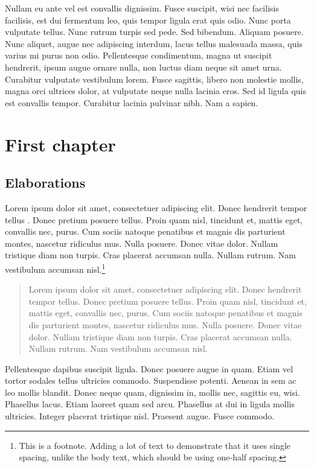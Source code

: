 \documentclass{hacett-socsci-thesis}
\begin{document}
Nullam eu ante vel est convallis dignissim.  Fusce suscipit, wisi nec
facilisis facilisis, est dui fermentum leo, quis tempor ligula erat
quis odio.  Nunc porta vulputate tellus.  Nunc rutrum turpis sed pede.
Sed bibendum.  Aliquam posuere.  Nunc aliquet, augue nec adipiscing
interdum, lacus tellus malesuada massa, quis varius mi purus non odio.
Pellentesque condimentum, magna ut suscipit hendrerit, ipsum augue
ornare nulla, non luctus diam neque sit amet urna.  Curabitur
vulputate vestibulum lorem.  Fusce sagittis, libero non molestie
mollis, magna orci ultrices dolor, at vulputate neque nulla lacinia
eros.  Sed id ligula quis est convallis tempor.  Curabitur lacinia
pulvinar nibh.  Nam a sapien.

\chapter{First chapter}
\section{Elaborations}

Lorem ipsum dolor sit amet, consectetuer adipiscing elit.  Donec
hendrerit tempor tellus \autocite{cheng1996}.  Donec pretium
posuere tellus.  Proin quam nisl, tincidunt et, mattis eget, convallis
nec, purus.  Cum sociis natoque penatibus et magnis dis parturient
montes, nascetur ridiculus mus.  Nulla posuere.  Donec vitae dolor.
Nullam tristique diam non turpis.  Cras placerat accumsan nulla.
Nullam rutrum.  Nam vestibulum accumsan nisl.\footnote{This is a
  footnote. Adding a lot of text to demonstrate that it uses single
  spacing, unlike the body text, which should be using one-half
  spacing.}

\begin{quote}
  Lorem ipsum dolor sit amet, consectetuer adipiscing elit.  Donec
  hendrerit tempor tellus.  Donec pretium posuere tellus.  Proin quam
  nisl, tincidunt et, mattis eget, convallis nec, purus.  Cum sociis
  natoque penatibus \autocite{mar-molinero2020} et magnis dis parturient
  montes, nascetur ridiculus mus.  Nulla posuere.  Donec vitae dolor.
  Nullam tristique diam non turpis.  Cras placerat accumsan nulla.
  Nullam rutrum.  Nam vestibulum accumsan nisl.
\end{quote}

Pellentesque dapibus suscipit ligula.  Donec posuere augue in quam.
Etiam vel tortor sodales tellus ultricies commodo.  Suspendisse
potenti.  Aenean in sem ac leo mollis blandit.  Donec neque quam,
dignissim in, mollis nec, sagittis eu, wisi.  Phasellus lacus.  Etiam
laoreet quam sed arcu.  Phasellus at dui in ligula mollis ultricies.
Integer placerat tristique nisl.  Praesent augue.  Fusce commodo.
\end{document}
